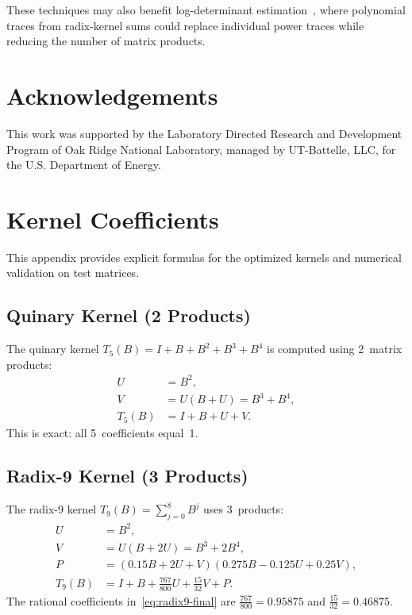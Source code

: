 \documentclass[
  journal=largetwo,
  manuscript=article,
  manuscriptlabel={Research Preprint},
  logo=false,
  simfonts=false,
  year=2026,
  volume=1,
]{cup-journal}
\theoremstyle{definition}
\theoremstyle{remark}
\newcommand{\paperbibliography}{\printbibliography}
\begin{document}
These techniques may also benefit log-determinant estimation~\cite{sao2025logdet},
where polynomial traces from radix-kernel sums could replace individual
power traces while reducing the number of matrix products.

\section*{Acknowledgements}
This work was supported by the Laboratory Directed Research and Development
Program of Oak Ridge National Laboratory, managed by UT-Battelle, LLC,
for the U.S. Department of Energy.


\paperbibliography

\clearpage
\appendix

\section{Kernel Coefficients}
\label{app:coeffs}

This appendix provides explicit formulas for the optimized kernels and
numerical validation on test matrices.

\subsection{Quinary Kernel (2 Products)}

The quinary kernel $T_5(B) = I + B + B^2 + B^3 + B^4$ is computed using
2~matrix products:
\begin{align}
  U &= B^2, \label{eq:quinary-U} \\
  V &= U(B + U) = B^3 + B^4, \label{eq:quinary-V} \\
  T_5(B) &= I + B + U + V. \label{eq:quinary-final}
\end{align}
This is exact: all 5~coefficients equal~1.

\subsection{Radix-9 Kernel (3 Products)}

The radix-9 kernel $T_9(B) = \sum_{j=0}^{8} B^j$ uses 3~products:
\begin{align}
  U &= B^2, \label{eq:radix9-U} \\
  V &= U(B + 2U) = B^3 + 2B^4, \label{eq:radix9-V} \\
  P &= (0.15B + 2U + V)(0.275B - 0.125U + 0.25V), \label{eq:radix9-P} \\
  T_9(B) &= I + B + \tfrac{767}{800}U + \tfrac{15}{32}V + P. \label{eq:radix9-final}
\end{align}
The rational coefficients in~\eqref{eq:radix9-final} are
$\frac{767}{800} = 0.95875$ and $\frac{15}{32} = 0.46875$.
\end{document}
